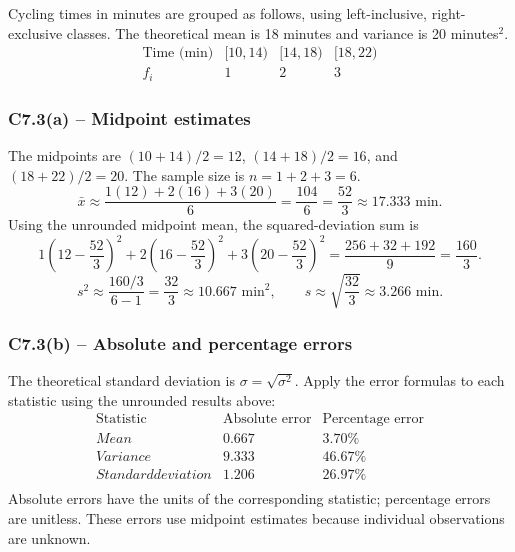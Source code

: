 {
Cycling times in minutes are grouped as follows, using left-inclusive,
right-exclusive classes. The theoretical mean is 18 minutes and variance
is 20 minutes$^2$.
\[
\begin{array}{c|rrr}
\text{Time (min)}&[10,14)&[14,18)&[18,22)\\\hline
f_i&1&2&3
\end{array}
\]
\label{sol:c7-3a}
\subsubsection*{C7.3(a) -- Midpoint estimates }
The midpoints are $(10+14)/2=12$, $(14+18)/2=16$, and
$(18+22)/2=20$. The sample size is $n=1+2+3=6$.
\[
\bar{x}\approx\frac{1(12)+2(16)+3(20)}{6}
=\frac{104}{6}=\frac{52}{3}\approx17.333\text{ min}.
\]
Using the unrounded midpoint mean, the squared-deviation sum is
\[
1\left(12-\frac{52}{3}\right)^2+
2\left(16-\frac{52}{3}\right)^2+
3\left(20-\frac{52}{3}\right)^2
=\frac{256+32+192}{9}=\frac{160}{3}.
\]
\[
s^2\approx\frac{160/3}{6-1}=\frac{32}{3}\approx10.667\text{ min}^2,
\qquad s\approx\sqrt{\frac{32}{3}}\approx3.266\text{ min}.
\]
\label{sol:c7-3b}
\subsubsection*{C7.3(b) -- Absolute and percentage errors }
The theoretical standard deviation is $\sigma=\sqrt{\sigma^2}$.
Apply the error formulas to each statistic using the unrounded results above:
\[
\begin{array}{l|rr}
\text{Statistic}&\text{Absolute error}&\text{Percentage error}\\\hline
Mean&0.667&3.70\%\\
Variance&9.333&46.67\%\\
Standard deviation&1.206&26.97\%\\
\end{array}
\]
Absolute errors have the units of the corresponding statistic; percentage errors are unitless.
These errors use midpoint estimates because individual observations are unknown.
\secInicio[sec:c7-3]
}

